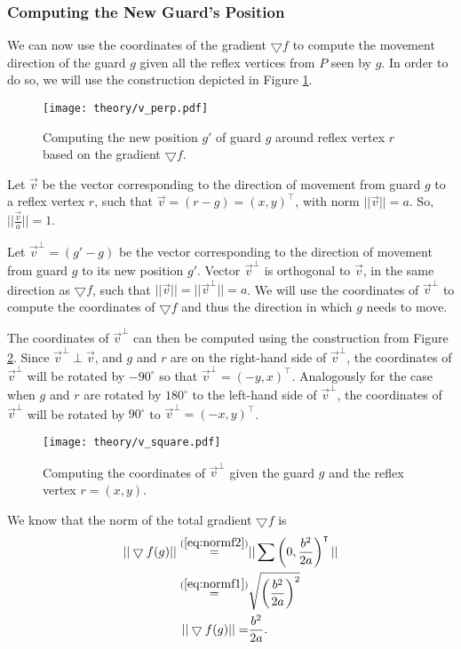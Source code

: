 \subsubsection{Computing the New Guard's Position}
We can now use the coordinates of the gradient $\bigtriangledown f$ to compute the movement direction of the guard $g$ given all the reflex vertices from $P$ seen by $g$. In order to do so, we will use the construction depicted in Figure \ref{fig:vperp}. 

\begin{figure}[h!]
    \centering
    \texttt{[image: theory/v\_perp.pdf]}
    \caption{Computing the new position $g'$ of guard $g$ around reflex vertex $r$ based on the gradient $\bigtriangledown f$.}
    \label{fig:vperp}
\end{figure}

Let $\vec v$ be the vector corresponding to the direction of movement from guard $g$ to a reflex vertex $r$, such that $\vec{v} = (r - g) = (x, y)^\intercal$, with norm $||\vec{v}|| = a$. So, $||\frac{\vec v}{a}|| = 1$.

Let $\vec{v}^\perp  = (g' - g)$ be the vector corresponding to the direction of movement from guard $g$ to its new position $g'$. Vector $\vec v^\perp$ is orthogonal to $\vec{v}$, in the same direction as $\bigtriangledown f$, such that $||\vec{v}|| = ||\vec{v}^\perp|| = a$. We will use the coordinates of $\vec{v}^\perp$ to compute the coordinates of $\bigtriangledown f$ and thus the direction in which $g$ needs to move.

The coordinates of $\vec v^\perp$ can then be computed using the construction from Figure \ref{fig:vsquare}. Since $\vec v^\perp \perp \vec v$, and $g$ and $r$ are on the right-hand side of $\vec v^\perp$, the coordinates of $\vec v^\perp$ will be rotated by $-90^\circ$ so that $\vec v^\perp = (-y, x)^\intercal$. Analogously for the case when $g$ and $r$ are rotated by $180^\circ$ to the left-hand side of $\vec v^\perp$, the coordinates of $\vec v^\perp$ will be rotated by $90^\circ$ to $\vec v^\perp = (-x, y)^\intercal$.

\begin{figure}[h!]
    \centering
    \texttt{[image: theory/v\_square.pdf]}
    \caption{Computing the coordinates of $\vec v^\perp$ given the guard $g$ and the reflex vertex $r = (x, y)$.}
    \label{fig:vsquare}
\end{figure}

We know that the norm of the total gradient $\bigtriangledown f$ is 
\begin{align}
    ||\bigtriangledown f(g)|| \overset{(\ref{eq:normf2})}{=} &||\sum \left(0, \frac{b^2}{2a}\right)^\intercal|| \nonumber \\
    \overset{(\ref{eq:normf1})}{=} &\sqrt{\left(\frac{b^2}{2a}\right)^2} \nonumber \\
    ||\bigtriangledown f(g)|| = &\frac{b^2}{2a}. \label{eq:normf}
\end{align}

